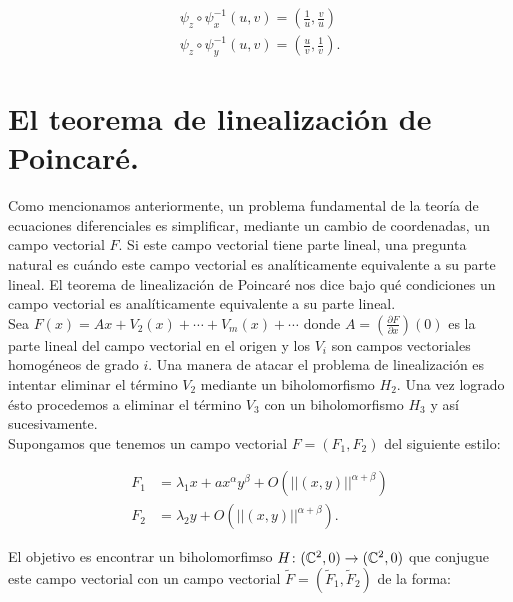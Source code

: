 \begin{equation} 
\label{CambiosDeCoordenadas}
\begin{aligned}
\psi_{z} \circ \psi^{-1}_{x}(u,v) = (\frac{1}{u},\frac{v}{u})\\
\psi_{z} \circ \psi^{-1}_{y}(u,v) = (\frac{u}{v},\frac{1}{v}).
\end{aligned}
\end{equation}


\section{El teorema de linealización de Poincaré.}
\label{sec:LinenalizacionDePoincare}
Como mencionamos anteriormente, un problema fundamental de la teoría de ecuaciones diferenciales es simplificar, mediante un cambio de coordenadas, un campo vectorial $F$. Si este campo vectorial tiene parte lineal, una pregunta natural es cuándo este campo vectorial es analíticamente equivalente a su parte lineal. El teorema de linealización de Poincaré nos dice bajo qué condiciones un campo vectorial es analíticamente equivalente a su parte lineal.\\

Sea $F(x)=Ax+V_{2}(x)+\cdots+V_{m}(x)+\cdots$ donde $A=(\tfrac{\partial F}{\partial x})(0)$ es la parte lineal del campo vectorial en el origen y los $V_{i}$ son campos vectoriales homogéneos de grado $i$. Una manera de atacar el problema de linealización es intentar eliminar el término $V_{2}$ mediante un biholomorfismo $H_{2}$. Una vez logrado ésto procedemos a eliminar el término $V_{3}$ con un biholomorfismo $H_{3}$ y así sucesivamente.\\

Supongamos que tenemos un campo vectorial  $F=(F_{1},F_{2})$ del siguiente estilo:

\begin{equation*}
\label{CampoVectInicial}
\begin{aligned}
F_{1} &= \lambda_{1}x +ax^{\alpha}y^{\beta}+O(||(x,y)||^{\alpha+\beta})\\
F_{2} &= \lambda_{2}y + O(||(x,y)||^{\alpha+\beta}).
\end{aligned}
\end{equation*}

\noindent El objetivo es encontrar un biholomorfimso $H\colon (\mathbb{C}^{2},0)\rightarrow(\mathbb{C}^{2},0)$ que conjugue este campo vectorial con un campo vectorial $\tilde{F}=(\tilde{F}_{1},\tilde{F}_{2})$ de la forma:

